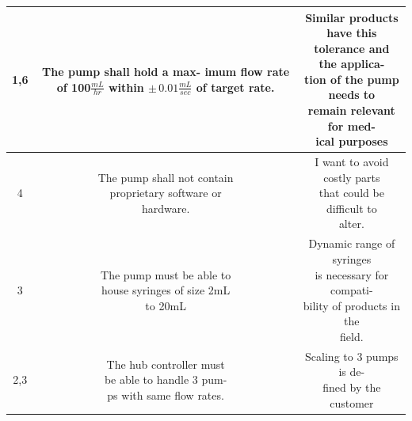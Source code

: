 \documentclass[journal]{IEEEtran}
\begin{document}
\begin{table}[H]
\begin{center}
\begin{tabular}{|c|c|c|}
                    1,6 & 
                    \makecell[l]{The pump shall hold a max-\\
                                 imum flow rate of 100$\frac{mL}{hr}$\\
                                 within $\pm \, 0.01 \frac{mL}{sec}$ of target\\
                                 rate.} & 
                    \makecell[l]{Similar products have this\\
                                 tolerance and the applica-\\
                                 tion of the pump needs to\\
                                 remain relevant for med-\\
                                 ical purposes} \\
                    \hline
                    
                    4 & 
                    \makecell[l]{The pump shall not contain\\
                                 proprietary software or \\
                                 hardware.} &
                    \makecell[l]{I want to avoid costly parts\\
                                 that could be difficult to\\
                                 alter.} \\
                    \hline
                    
                    3 & 
                    \makecell[l]{The pump must be able to \\
                                 house syringes of size 2mL\\
                                 to 20mL} &
                    \makecell[l]{Dynamic range of syringes\\
                                 is necessary for compati-\\
                                 bility of products in the\\
                                 field.} \\
                    \hline
                    
                    2,3 & 
                    \makecell[l]{The hub controller must\\
                                 be able to handle 3 pum-\\
                                 ps with same flow rates.} & 
                    \makecell[l]{Scaling to 3 pumps is de-\\
                                 fined by the customer} \\
                    \hline
                    

\end{tabular}
\end{center}
\end{table}
\end{document}
